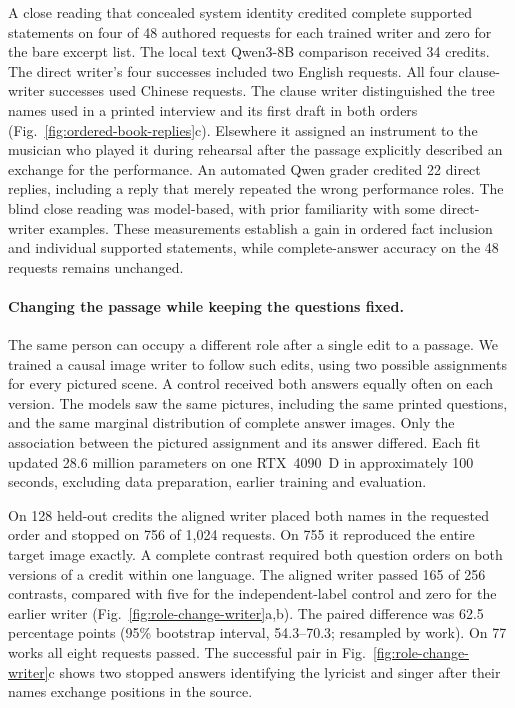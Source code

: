 \documentclass[12pt,a4paper]{article}
\providecommand{\DIFadd}[1]{{\protect\color{blue} \sf #1}} %
\begin{document}
\DIFadd{A close reading that concealed system identity credited complete supported statements on four of 48 authored requests for each trained writer and zero for the bare excerpt list. The local text Qwen3-8B comparison received 34 credits. The direct writer's four successes included two English requests. All four clause-writer successes used Chinese requests. The clause writer distinguished the tree names used in a printed interview and its first draft in both orders (Fig.~\ref{fig:ordered-book-replies}c). Elsewhere it assigned an instrument to the musician who played it during rehearsal after the passage explicitly described an exchange for the performance. An automated Qwen grader credited 22 direct replies, including a reply that merely repeated the wrong performance roles. The blind close reading was model-based, with prior familiarity with some direct-writer examples. These measurements establish a gain in ordered fact inclusion and individual supported statements, while complete-answer accuracy on the 48 requests remains unchanged.
}

\paragraph{\DIFadd{Changing the passage while keeping the questions fixed.}}
\DIFadd{The same person can occupy a different role after a single edit to a passage. We trained a causal image writer to follow such edits, using two possible assignments for every pictured scene. A control received both answers equally often on each version. The models saw the same pictures, including the same printed questions, and the same marginal distribution of complete answer images. Only the association between the pictured assignment and its answer differed. Each fit updated 28.6 million parameters on one RTX~4090~D in approximately 100 seconds, excluding data preparation, earlier training and evaluation.
}

\DIFadd{On 128 held-out credits the aligned writer placed both names in the requested order and stopped on 756 of 1,024 requests. On 755 it reproduced the entire target image exactly. A complete contrast required both question orders on both versions of a credit within one language. The aligned writer passed 165 of 256 contrasts, compared with five for the independent-label control and zero for the earlier writer (Fig.~\ref{fig:role-change-writer}a,b). The paired difference was 62.5 percentage points (95\% bootstrap interval, 54.3--70.3; resampled by work). On 77 works all eight requests passed. The successful pair in Fig.~\ref{fig:role-change-writer}c shows two stopped answers identifying the lyricist and singer after their names exchange positions in the source.
}
\end{document}
